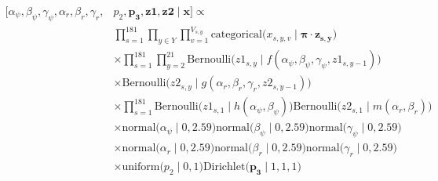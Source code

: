 \documentclass[12pt, oneside]{article}
\begin{document}
\begin{align*}
\big[ \alpha_{\psi}, \beta_{\psi}, \gamma_{\psi}, \alpha_{r}, \beta_{r}, \gamma_{r}, & p_{2}, \bm{p_{3}}, \bm{z1}, \bm{z2} \mid \bm{x} \big] \varpropto \\ 
& \prod_{s=1}^{181} \prod_{y \in Y} \prod_{v=1}^{V_{s,y}} \textrm{categorical} \big( x_{s,y,v} \mid \bm{\pi} \cdot \bm{z_{s,y}} \big) \\
& \times \prod_{s=1}^{181} \prod_{y=2}^{21} \textrm{Bernoulli} \big( z1_{s,y} \mid f( \alpha_{\psi}, \beta_{\psi}, \gamma_{\psi}, z1_{s,y-1}) \big) \\
& \times \textrm{Bernoulli} \big( z2_{s,y} \mid g( \alpha_{r}, \beta_{r}, \gamma_{r}, z2_{s,y-1}) \big) \\
& \times \prod_{s=1}^{181}  \textrm{Bernoulli} \big( z1_{s,1} \mid h( \alpha_{\psi}, \beta_{\psi}) \big) \textrm{Bernoulli} \big( z2_{s,1} \mid m( \alpha_{r}, \beta_{r}) \big) \\
& \times \textrm{normal} \big( \alpha_{\psi} \mid 0, 2.59 \big) \textrm{normal} \big( \beta_{\psi} \mid 0, 2.59 \big) \textrm{normal} \big( \gamma_{\psi} \mid 0, 2.59 \big) \\
& \times \textrm{normal} \big( \alpha_{r} \mid 0, 2.59 \big) \textrm{normal} \big( \beta_{r} \mid 0, 2.59 \big) \textrm{normal} \big( \gamma_{r} \mid  0, 2.59 \big) \\
& \times \textrm{uniform} \big( p_{2} \mid 0, 1 \big) \textrm{Dirichlet} \big( \bm{p_{3}} \mid 1,1,1 \big) \\
\end{align*}
\end{document}
